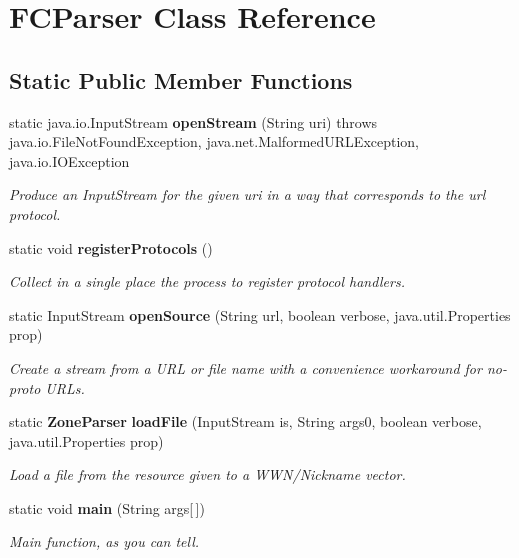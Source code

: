 \section{F\+C\+Parser Class Reference}
\label{classorg_1_1smallfoot_1_1parser_1_1FCParser}
\subsection*{Static Public Member Functions}
\begin{DoxyCompactItemize}
\item 
static java.\+io.\+Input\+Stream {\bf open\+Stream} (String uri)  throws java.\+io.\+File\+Not\+Found\+Exception, java.\+net.\+Malformed\+U\+R\+L\+Exception, java.\+io.\+I\+O\+Exception     
\begin{DoxyCompactList}\small\item\em Produce an Input\+Stream for the given uri in a way that corresponds to the url protocol. \end{DoxyCompactList}\item 
static void {\bf register\+Protocols} ()
\begin{DoxyCompactList}\small\item\em Collect in a single place the process to register protocol handlers. \end{DoxyCompactList}\item 
static Input\+Stream {\bf open\+Source} (String url, boolean verbose, java.\+util.\+Properties prop)
\begin{DoxyCompactList}\small\item\em Create a stream from a U\+R\+L or file name with a convenience workaround for no-\/proto U\+R\+Ls. \end{DoxyCompactList}\item 
static {\bf Zone\+Parser} {\bf load\+File} (Input\+Stream is, String args0, boolean verbose, java.\+util.\+Properties prop)
\begin{DoxyCompactList}\small\item\em Load a file from the resource given to a W\+W\+N/\+Nickname vector. \end{DoxyCompactList}\item 
static void {\bf main} (String args[$\,$])
\begin{DoxyCompactList}\small\item\em Main function, as you can tell. \end{DoxyCompactList}\end{DoxyCompactItemize}


